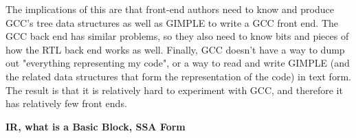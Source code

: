 The implications of this are that front-end authors need to know and produce GCC's tree data structures as well as GIMPLE to write a GCC front end.
The GCC back end has similar problems, so they also need to know bits and pieces of how the RTL back end works as well.
Finally, GCC doesn't have a way to dump out "everything representing my code", or a way to read and write GIMPLE (and the related data structures that form the representation of the code) in text form. The result is that it is relatively hard to experiment with GCC, and therefore it has relatively few front ends.


\textbf{IR, what is a Basic Block, SSA Form}

